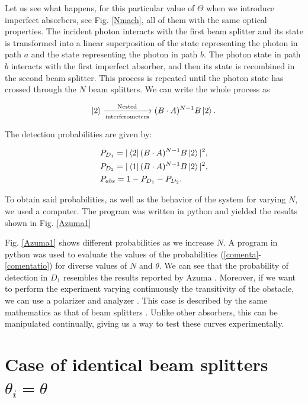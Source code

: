 \documentclass[12pt]{book}
\begin{document}
  Let us see what happens, for this particular value of $\Theta$ when we introduce imperfect absorbers, see Fig. \ref{Nmach}, all of them with the same optical properties. The incident photon interacts with the first beam splitter and its state is transformed into a linear superposition of the state representing the photon in path $a$ and the state representing the photon in path $b$. The photon state in path $b$  interacts with the first imperfect absorber, and then its state is recombined in the second beam splitter. This process is repeated until the photon state has crossed through the $N$ beam splitters. We can write the whole process as 


\begin{equation}\ket{2}\xrightarrow[\text{interferometers}]{\text{Nested}}(B \cdot A)^{N-1}B \ket{2}.
\end{equation}

The detection probabilities are given by:

\begin{align}
&P_{D_{1}}=|\bra{2} (B \cdot A)^{N-1}B \ket{2}|^2,\label{comenta}\\
&P_{D_{2}}=|\bra{1} (B \cdot A)^{N-1}B \ket{2}|^2,\\
&P_{abs}=1-P_{D_{1}}-P_{D_{2}}.
\label{comentatio}
\end{align}
 
 
To obtain said probabilities, as well as the behavior of the system for varying $N$, we used a computer. The program was written in python and yielded the results shown in Fig. \ref{Azuma1}




Fig. \ref{Azuma1} shows  different probabilities as we increase $N$. A program in python was used to evaluate the values of the probabilities (\ref{comenta}-\ref{comentatio}) for diverse values of $N$ and $\theta$. We can see that the probability of detection in $D_{1}$ resembles the results reported by Azuma \cite{Azuma}. Moreover, if we want to perform the experiment varying continuously the transitivity of the obstacle, we can use a polarizer and analyzer \cite{nosirve}.  This case is described by the same mathematics as that of beam splitters \cite{nosirve}. Unlike other absorbers, this can be manipulated continually, giving us a way to test these curves experimentally. 



 \section{Case of identical beam splitters $\theta_{i}=\theta$}
 
\end{document}
